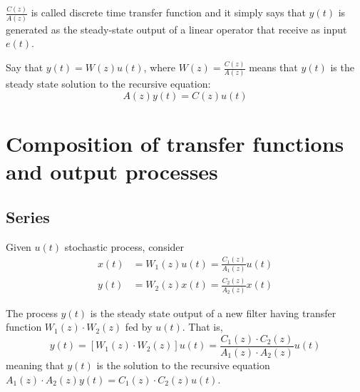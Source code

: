 \documentclass[10pt,a4paper,twoside,openright]{book}
\begin{document}
$\frac{C(z)}{A(z)}$ is called discrete time transfer function and it simply says that $y(t)$ is generated as the steady-state output of a linear operator that receive as input $e(t)$.














































Say that $y(t)=W(z)u(t)$, where $W(z)=\frac{C(z)}{A(z)}$ means that $y(t)$ is the steady state solution to the recursive equation:
\[
	A(z)y(t)=C(z)u(t)
\]

\section{Composition of transfer functions and output processes}
\subsection{Series}
Given $u(t)$ stochastic process, consider
\begin{align*}
	x(t)&=W_{1}(z)u(t)=\frac{C_{1}(z)}{A_{1}(z)}u(t)\\
	y(t)&=W_{2}(z)x(t)=\frac{C_{2}(z)}{A_{2}(z)}x(t)
\end{align*}
\begin{theorem}
	The process $y(t)$ is the steady state output of a new filter having transfer function $W_{1}(z)\cdot W_{2}(z)$ fed by $u(t)$. That is,
	\[
		y(t)=[W_{1}(z)\cdot W_{2}(z)]u(t)=\frac{C_{1}(z)\cdot C_{2}(z)}{A_{1}(z)\cdot A_{2}(z)}u(t)
	\]
	meaning that $y(t)$ is the solution to the recursive equation $A_{1}(z)\cdot A_{2}(z) y(t) = C_{1}(z)\cdot C_{2}(z)u(t)$.
\end{theorem}
\end{document}
